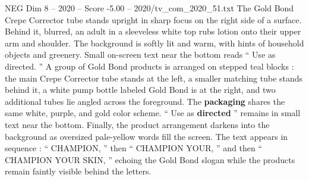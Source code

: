 \begin{textsample}{NEG Dim 8 – 2020 – Score -5.00 – 2020/tv\_com\_2020\_51.txt}
The Gold Bond Crepe Corrector tube stands upright in sharp focus on the right side of a surface.
Behind it, blurred, an adult in a sleeveless white top rubs lotion onto their upper arm and shoulder.
The background is softly lit and warm, with hints of household objects and greenery.
Small on-screen text near the bottom reads “ Use as directed. ” A group of Gold Bond products is arranged on stepped teal blocks : the main Crepe Corrector tube stands at the left, a smaller matching tube stands behind it, a white pump bottle labeled Gold Bond is at the right, and two additional tubes lie angled across the foreground.
The \textbf{packaging} shares the same white, purple, and gold color scheme. “ Use as \textbf{directed} ” remains in small text near the bottom.
Finally, the product arrangement darkens into the background as oversized pale-yellow words fill the screen.
The text appears in sequence : “ CHAMPION, ” then “ CHAMPION YOUR, ” and then “ CHAMPION YOUR SKIN, ” echoing the Gold Bond slogan while the products remain faintly visible behind the letters.

\end{textsample}
